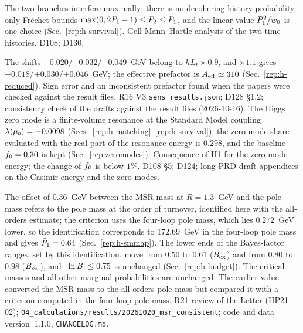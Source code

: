 \begin{description}
{The two branches interfere maximally; there is no decohering history probability, only Fr\'echet bounds $\max(0,2P_1-1)\le P_2\le P_1$, and the linear value $P_1^2/w_0$ is one choice (Sec.~\ref{rep:h-survival}).}
{Gell-Mann--Hartle analysis of the two-time histories.}
{D108; D130.}

{The shifts $-0.020/\allowbreak{-0.032}/\allowbreak{-0.049}$~GeV belong to $hL_b\times0.9$, and $\times1.1$ gives $+0.018/\allowbreak{+0.030}/\allowbreak{+0.046}$~GeV; the effective prefactor is $A_{\rm eff}\simeq310$ (Sec.~\ref{rep:h-reduced}).}
{Sign error and an inconsistent prefactor found when the papers were checked against the result files.}
{R16 V3 \texttt{sens\_results.json}; D128 \S1.2; consistency check of the drafts against the result files (2026-10-16).}
{The Higgs zero mode is a finite-volume resonance at the Standard Model coupling $\lambda(\mu_b)=-0.0098$ (Secs.~\ref{rep:h-matching}--\ref{rep:h-survival}); the zero-mode share evaluated with the real part of the resonance energy is $0.298$, and the baseline $f_0=0.30$ is kept (Sec.~\ref{rep:zeromodes}).}
{Consequence of H1 for the zero-mode energy; the change of $f_0$ is below $1\%$.}
{D108 \S5; D124; long PRD draft appendices on the Casimir energy and the zero modes.}

{The offset of $0.36$~GeV between the MSR mass at $R=1.3$~GeV and the pole mass refers to the pole mass at the order of turnover, identified here with the all-orders estimate; the criterion uses the four-loop pole mass, which lies $0.272$~GeV lower, so the identification corresponds to $172.69$~GeV in the four-loop pole mass and gives $\bar P_1=0.64$ (Sec.~\ref{rep:h-smmap}). The lower ends of the Bayes-factor ranges, set by this identification, move from $0.50$ to $0.61$ ($B_{\rm ex}$) and from $0.80$ to $0.98$ ($B_{\rm sel}$), and $|\ln B|\le0.75$ is unchanged (Sec.~\ref{rep:h-budget}). The critical masses and all other marginal probabilities are unchanged.} %
{The earlier value converted the MSR mass to the all-orders pole mass but compared it with a criterion computed in the four-loop pole mass.}
{R21 review of the Letter (HP21-02); \texttt{04\_calculations/\allowbreak{}results/\allowbreak{}20261020\_\allowbreak{}msr\_\allowbreak{}consistent}; code and data version~1.1.0, \texttt{CHANGELOG.md}.}


\end{description}
